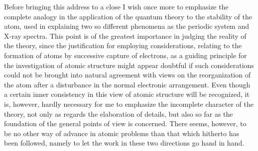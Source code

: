 
Before bringing this address to a close I wish once more to
emphasize the complete analogy in the application of the
quantum theory to the stability of the atom, used in explaining
two so different phenomena as the periodic system and X-ray
spectra. This point is of the greatest importance in judging the
reality of the theory, since the justification for employing considerations,
relating to the formation of atoms by successive capture
of electrons, as a guiding principle for the investigation of atomic
structure might appear doubtful if such considerations could not
be brought into natural agreement with views on the reorganization
of the atom after a disturbance in the normal electronic
arrangement. Even though a certain inner consistency in this
view of atomic structure will be recognized, it is, however, hardly
necessary for me to emphasize the incomplete character of the
theory, not only as regards the elaboration of details, but also so
far as the foundation of the general points of view is concerned.
There seems, however, to be no other way of advance in atomic
problems than that which hitherto has been followed, namely to let
the work in these two directions go hand in hand.

